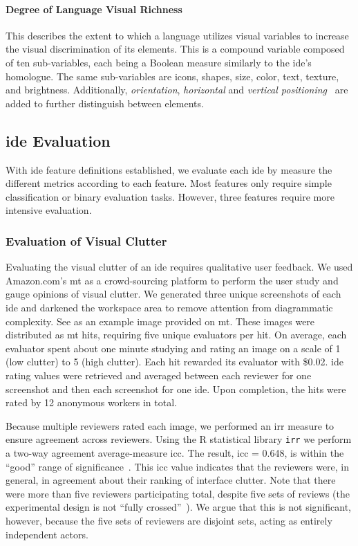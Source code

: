 \paragraph{Degree of Language Visual Richness}
This describes the extent to which a language utilizes visual variables to increase the visual discrimination of its elements.
This is a compound variable composed of ten sub-variables, each being a Boolean measure similarly to the \ac{ide}'s homologue.
The same sub-variables are icons, shapes, size, color, text, texture, and brightness.
Additionally, \emph{orientation}, \emph{horizontal} and \emph{vertical positioning}~\cite{moody2009} are added to further distinguish between elements.


\subsection{\acs{ide} Evaluation} \label{subsec:ideevaluation}

With \ac{ide} feature definitions established, we evaluate each \ac{ide} by measure the different metrics according to each feature.
Most features only require simple classification or binary evaluation tasks.
However, three features require more intensive evaluation.


\subsubsection{Evaluation of Visual Clutter} \label{subsubsec:mturk}

Evaluating the visual clutter of an \ac{ide} requires qualitative user feedback.
We used Amazon.com's \ac{mt} as a crowd-sourcing platform to perform the user study and gauge opinions of visual clutter.
We generated three unique screenshots of each \ac{ide} and darkened the
workspace area to remove attention from diagrammatic complexity. See
 as an example image provided on \ac{mt}.
These images were distributed as \ac{mt} \acp{hit}, requiring five unique evaluators per \ac{hit}.
On average, each evaluator spent about one minute studying and rating an image on a scale of 1 (low clutter) to 5 (high clutter).
Each \ac{hit} rewarded its evaluator with \$0.02.
\ac{ide} rating values were retrieved and averaged between each reviewer for one screenshot and then each screenshot for one \ac{ide}.
Upon completion, the \acp{hit} were rated by 12 anonymous workers in total.

Because multiple reviewers rated each image, we performed an \ac{irr} measure to ensure agreement across reviewers.
Using the R statistical library \texttt{irr} we perform a two-way agreement average-measure \ac{icc}.
The result, \ac{icc} = 0.648, is within the ``good'' range of significance~\cite{cicchetti1994,hallgren2012}.
This \ac{icc} value indicates that the reviewers were, in general, in agreement about their ranking of interface clutter.
Note that there were more than five reviewers participating total, despite five sets of reviews (\ie the experimental design is not ``fully crossed''~\cite{hallgren2012}).
We argue that this is not significant, however, because the five sets of reviewers are disjoint sets, acting as entirely independent actors.

